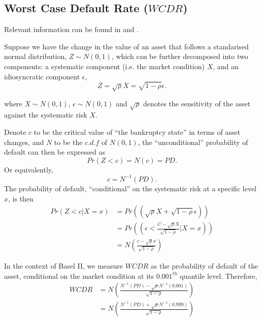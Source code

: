 \documentclass[12pt]{article} 
\begin{document}
\subsection*{Worst Case Default Rate (\(WCDR\))}

Relevant information can be found in \citet[Chapter 11.5]{hull2012risk} and
\citet[Chapter 3.3]{trueck2009rating}.

Suppose we have the change in the value of an asset that follows a standarised
normal distribution, \(Z \sim N(0, 1)\), which can be further decomposed
\citep{belkin1998one} into two components: a systematic component (i.e. the
market condition) \(X\), and an idiosyncratic component \(\epsilon\),
\[ Z = \sqrt{\rho} X = \sqrt{1 - \rho} \epsilon. \]

where \(X \sim N(0, 1)\), \(\epsilon \sim N(0, 1)\) and \(\sqrt{\rho}\) denotes
the sensitivity of the asset against the systematic risk \(X\).

Denote \(c\) to be the critical value of ``the bankruptcy state'' in terms of
asset changes, and \(N\) to be the \(c.d.f\) of \(N(0, 1)\), the
``unconditional'' probability of default can then be expressed as
\[ Pr(Z < c) = N(c) = PD. \]
Or equivalently,
\[ c = N^{-1}(PD). \]
The probability of default, ``conditional'' on the
systematic risk at a specific level \(x\), is then
\begin{align*}
  Pr(Z < c | X = x) & = Pr \left( (\sqrt{\rho} X + \sqrt{1 - \rho} \epsilon) \right) \\
                    & = Pr \left( (\epsilon < \frac{C - \sqrt{\rho} X}{\sqrt{1 - \rho}} | X = x) \right) \\
                    & = N \left( \frac{c - \sqrt{\rho} x}{\sqrt{1 - \rho}} \right)
\end{align*}

In the context of Basel II, we measure \(WCDR\) as the probability of default of
the asset, conditional on the market condition at its \(0.001^{th}\) quantile
level. Therefore,
\begin{align*}
  WCDR & = N \left( \frac{N^{-1}(PD) - \sqrt{\rho} N^{-1}(0.001)}{\sqrt{1 - \rho}} \right) \\
       & = N \left( \frac{N^{-1}(PD) + \sqrt{\rho} N^{-1}(0.999)}{\sqrt{1 - \rho}} \right)
\end{align*}

\FloatBarrier


\end{document}
